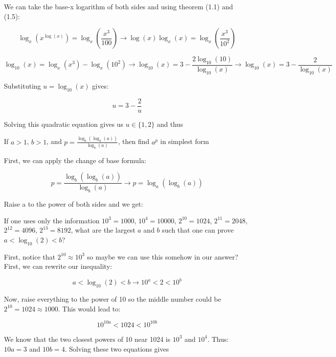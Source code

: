 \begin{solution}
We can take the base-x logarithm of both sides and using theorem (1.1) and (1.5):

$$
  \log_x(x^{\log(x)}) = \log_x(\frac{x^3}{100}) 
  \rightarrow 
  \log(x)\log_x(x) = \log_x(\frac{x^3}{10^2})
$$

$$
  \log_{10}(x) = \log_x(x^3)-\log_x(10^2)
  \rightarrow
  \log_{10}(x) = 3-\frac{2\log_{10}(10)}{\log_{10}(x)}
  \rightarrow
  \log_{10}(x) = 3-\frac{2}{\log_{10}(x)}
$$

Substituting $u=\log_{10}(x)$ gives:

$$ u = 3-\frac{2}{u} $$

Solving this quadratic equation gives us $u\in\{1,2\}$ and thus 

\end{solution}

\begin{question}

If $a > 1$, $b > 1$, and $p = \frac{\log_b(\log_b(a))}{\log_b(a)}$, then find $a^p$ in simplest form

\end{question}

\begin{solution}

First, we can apply the change of base formula:

$$ 
   p = \frac{\log_b(\log_b(a))}{\log_b(a)} \rightarrow
   p = \log_a(\log_b(a))
$$

Raise a to the power of both sides and we get: 

\end{solution}

\begin{question}

If one uses only the information $10^3 = 1000$, $10^4 = 10000$, $2^{10} = 1024$, $2^{11}=2048$,
$2^{12}=4096$,  $2^{13}=8192$, what are the largest $a$ and $b$ such that one can prove
$a<\log_{10}(2)<b$?

\end{question}

\begin{solution}

First, notice that $2^10 \approx 10^3$ so maybe we can use this somehow in our answer? First, we can rewrite our inequality:

$$
a<\log_{10}(2)<b \rightarrow 10^a < 2 < 10^b
$$

Now, raise everything to the power of 10 so the middle number could be $2^{10} = 1024 \approx 1000$. This would lead to:

$$
10^{10a} < 1024 < 10^{10b}
$$

We know that the two closest powers of 10 near 1024 is $10^3$ and $10^4$. Thus: $10a=3$ and $10b=4$. Solving these two equations gives 

\end{solution}

